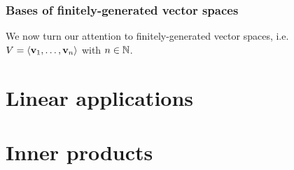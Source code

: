 \subsubsection{Bases of finitely-generated vector spaces}

We now turn our attention to finitely-generated vector spaces, i.e. $ V = \braket{\mathbf{v}_1 , \dots , \mathbf{v}_n} $ with $ n \in \mathbb{N} $.









\section{Linear applications}

\section{Inner products}
